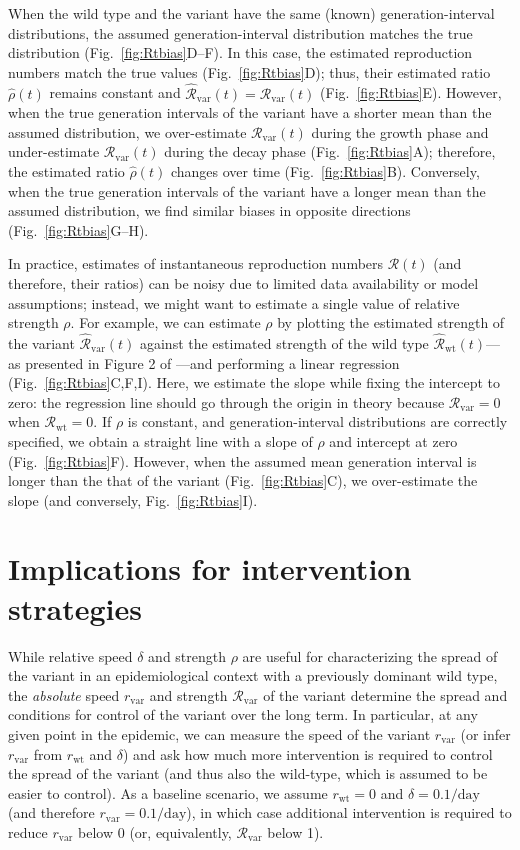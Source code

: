 \documentclass[12pt]{article}
\newcommand{\fref}[1]{Fig.~\ref{fig:#1}}
\newcommand{\vvvar}{\mathrm{var}}
\newcommand{\wwwt}{\mathrm{wt}}
\newcommand{\rx}[1]{\ensuremath{{r}_{#1}}\xspace}
\newcommand{\rw}{\rx{\wwwt}}
\newcommand{\rv}{\rx{\vvvar}}
\newcommand{\Rx}[1]{\ensuremath{{\mathcal R}_{#1}}\xspace}
\newcommand{\RR}{\ensuremath{{\mathcal R}}\xspace}
\newcommand{\Rw}{\Rx{\wwwt}}
\newcommand{\Rv}{\Rx{\vvvar}}
\newcommand{\pday}{\ensuremath{/\textrm{day}}}
\begin{document}
When the wild type and the variant have the same (known) generation-interval distributions, the assumed generation-interval distribution matches the true distribution (\fref{Rtbias}D--F).
In this case, the estimated reproduction numbers match the true values (\fref{Rtbias}D); thus, their estimated ratio $\hat{\rho}(t)$ remains constant and $\hat{\RR}_{\textrm{var}}(t)=\Rv(t)$ (\fref{Rtbias}E).
However, when the true generation intervals of the variant have a shorter mean than the assumed distribution, we over-estimate $\Rv(t)$ during the growth phase and under-estimate $\Rv(t)$ during the decay phase (\fref{Rtbias}A);
therefore, the estimated ratio $\hat{\rho}(t)$ changes over time (\fref{Rtbias}B).
Conversely, when the true generation intervals of the variant have a longer mean than the assumed distribution, we find similar biases in opposite directions (\fref{Rtbias}G--H).

In practice, estimates of instantaneous reproduction numbers $\RR(t)$ (and therefore, their ratios) can be noisy due to limited data availability or model assumptions;
instead, we might want to estimate a single value of relative strength $\rho$.
For example, we can estimate $\rho$ by plotting the estimated strength of the variant $\hat{\RR}_{\textrm{var}}(t)$ against the estimated strength of the wild type $\hat{\RR}_{\textrm{wt}}(t)$---as presented in Figure 2 of \cite{volz2021transmission}---and performing a linear regression (\fref{Rtbias}C,F,I).
Here, we estimate the slope while fixing the intercept to zero: the regression line should go through the origin in theory because $\Rv = 0$ when $\Rw = 0$.
If $\rho$ is constant, and generation-interval distributions are correctly specified, we obtain a straight line with a slope of $\rho$ and intercept at zero (\fref{Rtbias}F).
However, when the assumed mean generation interval is longer than the that of the variant (\fref{Rtbias}C), we over-estimate the slope (and conversely, \fref{Rtbias}I).

\section{Implications for intervention strategies}

While relative speed $\delta$ and strength $\rho$ are useful for characterizing the spread of the variant in an epidemiological context with a previously dominant wild type, the \emph{absolute} speed $\rv$ and strength $\Rv$ of the variant determine the spread and conditions for control of the variant over the long term.
In particular, at any given point in the epidemic, we can measure the speed of the variant $\rv$ (or infer $\rv$ from $\rw$ and $\delta$) and ask how much more intervention is required to control the spread of the variant (and thus also the wild-type, which is assumed to be easier to control). 
As a baseline scenario, we assume $\rw=0$ and $\delta=0.1\pday$ (and therefore $\rv=0.1\pday$), in which case additional intervention is required to reduce $\rv$ below 0 (or, equivalently, $\Rv$ below 1).
\end{document}
